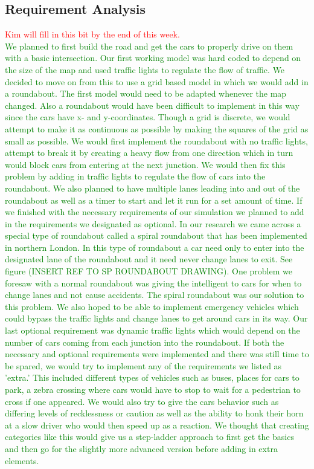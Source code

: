 \documentclass{article}
\begin{document}
\subsection{Requirement Analysis}
\textcolor{red}{Kim will fill in this bit by the end of this week.}\\
\noindent
\textcolor{green}{We planned to first build the road and get the cars to properly drive on them with a basic intersection. Our first working model was hard coded to depend on the size of the map and used traffic lights to regulate the flow of traffic. We decided to move on from this to use a grid based model in which we would add in a roundabout. The first model would need to be adapted whenever the map changed. Also a roundabout would have been difficult to implement in this way since the cars have x- and y-coordinates. Though a grid is discrete, we would attempt to make it as continuous as possible by making the squares of the grid as small as possible. We would first implement the roundabout with no traffic lights, attempt to break it by creating a heavy flow from one direction which in turn would block cars from entering at the next junction. We would then fix this problem by adding in traffic lights to regulate the flow of cars into the roundabout. We also planned to have multiple lanes leading into and out of the roundabout as well as a timer to start and let it run for a set amount of time.	
	If we finished with the necessary requirements of our simulation we planned to add in the requirements we designated as optional. In our research we came across a special type of roundabout called a spiral roundabout that has been implemented in northern London. In this type of roundabout a car need only to enter into the designated lane of the roundabout and it need never change lanes to exit. See figure (INSERT REF TO SP ROUNDABOUT DRAWING). One problem we foresaw with a normal roundabout was giving the intelligent to cars for when to change lanes and not cause accidents. The spiral roundabout was our solution to this problem. We also hoped to be able to implement emergency vehicles which could bypass the traffic lights and change lanes to get around cars in its way. Our last optional requirement was dynamic traffic lights which would depend on the number of cars coming from each junction into the roundabout.
	If both the necessary and optional requirements were implemented and there was still time to be spared, we would try to implement any of the requirements we listed as 'extra.' This included different types of vehicles such as buses, places for cars to park, a zebra crossing where cars would have to stop to wait for a pedestrian to cross if one appeared. We would also try to give the cars behavior such as differing levels of recklessness or caution as well as the ability to honk their horn at a slow driver who would then speed up as a reaction.
	We thought that creating categories like this would give us a step-ladder approach to first get the basics and then go for the slightly more advanced version before adding in extra elements.}
\end{document}
